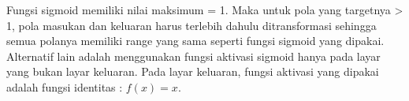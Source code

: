 \par 
Fungsi sigmoid memiliki nilai maksimum = 1. Maka untuk pola yang
targetnya > 1, pola masukan dan keluaran harus terlebih dahulu ditransformasi
sehingga semua polanya memiliki range yang sama seperti fungsi sigmoid yang
dipakai. Alternatif lain adalah menggunakan fungsi aktivasi sigmoid hanya pada
layar yang bukan layar keluaran. Pada layar keluaran, fungsi aktivasi yang dipakai
adalah fungsi identitas : $ 𝑓(𝑥) = 𝑥 $.

